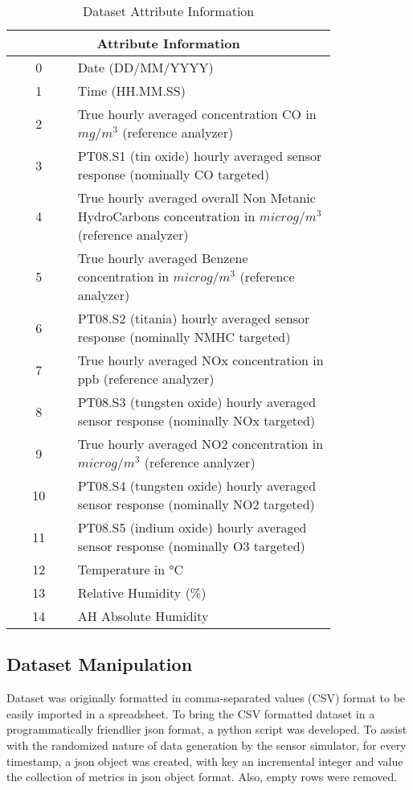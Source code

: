 \begin{table}[!h]
\begin{tabular}{|c|p{0.8\linewidth}|}
    \hline
    \multicolumn{2}{|c|}{\textbf{Attribute Information}} \\
    \hline
    \hline
    0& Date (DD/MM/YYYY) \\ \hline
    1& Time (HH.MM.SS) \\ \hline
    2& True hourly averaged concentration CO in $mg/m^3$ (reference analyzer) \\ \hline
    3& PT08.S1 (tin oxide) hourly averaged sensor response (nominally CO targeted) \\ \hline
    4& True hourly averaged overall Non Metanic HydroCarbons concentration in $microg/m^3$ (reference analyzer) \\ \hline
    5& True hourly averaged Benzene concentration in $microg/m^3$ (reference analyzer) \\ \hline
    6& PT08.S2 (titania) hourly averaged sensor response (nominally NMHC targeted) \\ \hline
    7& True hourly averaged NOx concentration in ppb (reference analyzer) \\ \hline
    8& PT08.S3 (tungsten oxide) hourly averaged sensor response (nominally NOx targeted) \\ \hline
    9& True hourly averaged NO2 concentration in $microg/m^3$ (reference analyzer) \\ \hline
    10& PT08.S4 (tungsten oxide) hourly averaged sensor response (nominally NO2 targeted) \\ \hline
    11& PT08.S5 (indium oxide) hourly averaged sensor response (nominally O3 targeted) \\ \hline
    12& Temperature in °C \\ \hline
    13& Relative Humidity (\%) \\ \hline
    14& AH Absolute Humidity  \\ \hline
\end{tabular}
\centering
\caption{Dataset Attribute Information}
\label{fig:dataset_attri}
\end{table}

\subsection{Dataset Manipulation}
Dataset was originally formatted in comma-separated values (CSV) format to be easily imported in a spreadsheet. To bring the CSV formatted dataset in a programmatically friendlier json format, a python script was developed. 
To assist with the randomized nature of data generation by the sensor simulator, for every timestamp, a json object was created, with key an incremental integer and value the collection of metrics in json object format. Also, empty rows were removed.

